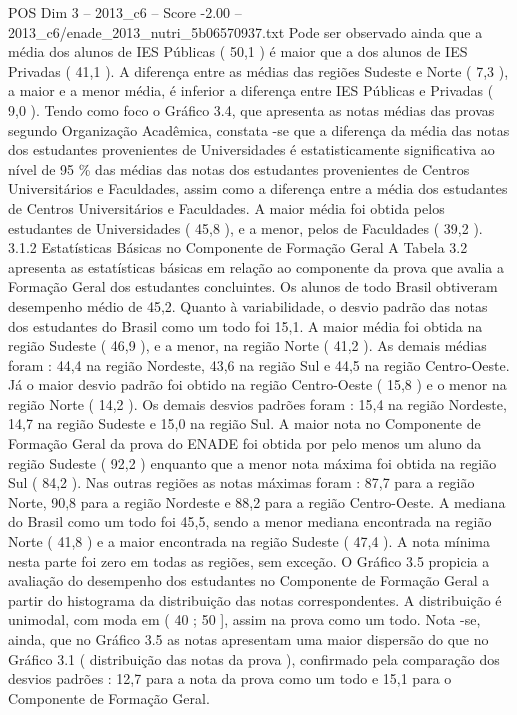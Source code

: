 \begin{textsample}{POS Dim 3 – 2013\_c6 – Score -2.00 – 2013\_c6/enade\_2013\_nutri\_5b06570937.txt}
Pode ser observado ainda que a média dos alunos de IES Públicas ( 50,1 ) é maior que a dos alunos de IES Privadas ( 41,1 ).
A diferença entre as médias das regiões Sudeste e Norte ( 7,3 ), a maior e a menor média, é inferior a diferença entre IES Públicas e Privadas ( 9,0 ).
Tendo como foco o Gráfico 3.4, que apresenta as notas médias das provas segundo Organização Acadêmica, constata -se que a diferença da média das notas dos estudantes provenientes de Universidades é estatisticamente significativa ao nível de 95 \% das médias das notas dos estudantes provenientes de Centros Universitários e Faculdades, assim como a diferença entre a média dos estudantes de Centros Universitários e Faculdades.
A maior média foi obtida pelos estudantes de Universidades ( 45,8 ), e a menor, pelos de Faculdades ( 39,2 ). 3.1.2 Estatísticas Básicas no Componente de Formação Geral A Tabela 3.2 apresenta as estatísticas básicas em relação ao componente da prova que avalia a Formação Geral dos estudantes concluintes.
Os alunos de todo Brasil obtiveram desempenho médio de 45,2.
Quanto à variabilidade, o desvio padrão das notas dos estudantes do Brasil como um todo foi 15,1.
A maior média foi obtida na região Sudeste ( 46,9 ), e a menor, na região Norte ( 41,2 ).
As demais médias foram : 44,4 na região Nordeste, 43,6 na região Sul e 44,5 na região Centro-Oeste.
Já o maior desvio padrão foi obtido na região Centro-Oeste ( 15,8 ) e o menor na região Norte ( 14,2 ).
Os demais desvios padrões foram : 15,4 na região Nordeste, 14,7 na região Sudeste e 15,0 na região Sul.
A maior nota no Componente de Formação Geral da prova do ENADE foi obtida por pelo menos um aluno da região Sudeste ( 92,2 ) enquanto que a menor nota máxima foi obtida na região Sul ( 84,2 ).
Nas outras regiões as notas máximas foram : 87,7 para a região Norte, 90,8 para a região Nordeste e 88,2 para a região Centro-Oeste.
A mediana do Brasil como um todo foi 45,5, sendo a menor mediana encontrada na região Norte ( 41,8 ) e a maior encontrada na região Sudeste ( 47,4 ).
A nota mínima nesta parte foi zero em todas as regiões, sem exceção.
O Gráfico 3.5 propicia a avaliação do desempenho dos estudantes no Componente de Formação Geral a partir do histograma da distribuição das notas correspondentes.
A distribuição é unimodal, com moda em ( 40 ; 50 ], assim na prova como um todo.
Nota -se, ainda, que no Gráfico 3.5 as notas apresentam uma maior dispersão do que no Gráfico 3.1 ( distribuição das notas da prova ), confirmado pela comparação dos desvios padrões : 12,7 para a nota da prova como um todo e 15,1 para o Componente de Formação Geral.

\end{textsample}
